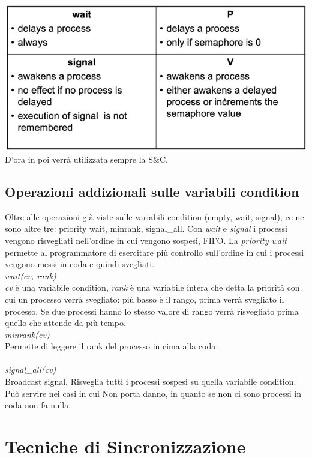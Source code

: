 \documentclass[10pt,a4paper]{book}
\begin{document}
\includegraphics[scale=0.41]{img/vs.png} \\
D'ora in poi verrà utilizzata sempre la S\&C.

\subsection{Operazioni addizionali sulle variabili condition}
Oltre alle operazioni già viste sulle variabili condition (empty, wait, signal), ce ne sono altre tre: priority wait, minrank, signal\_all.
Con \textit{wait} e \textit{signal} i processi vengono risvegliati nell'ordine in cui vengono sospesi, FIFO. La \textit{priority wait} permette al programmatore di esercitare più controllo sull'ordine in cui i processi vengono messi in coda e quindi svegliati.\\
\textit{wait(cv, rank)}\\
\textit{cv} è una variabile condition, \textit{rank} è una variabile intera che detta la priorità con cui un processo verrà svegliato: più basso è il rango, prima verrà svegliato il processo. Se due processi hanno lo stesso valore di rango verrà risvegliato prima quello che attende da più tempo.\\
\textit{minrank(cv)}\\
Permette di leggere il rank del processo in cima alla coda.\\ \\
\textit{signal\_all(cv)}\\
Broadcast signal. Risveglia tutti i processi sospesi su quella variabile condition. Può servire nei casi in cui 
Non porta danno, in quanto se non ci sono processi in coda non fa nulla.

\section{Tecniche di Sincronizzazione}
\end{document}
